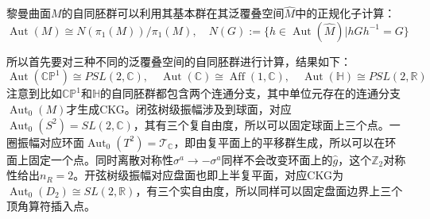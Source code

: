 \begin{boxedtext}[黎曼曲面自同胚群]
	黎曼曲面$M$的自同胚群可以利用其基本群在其泛覆叠空间$\hat M$中的正规化子计算：
	\begin{equation*}
		\operatorname{Aut}(M)\cong N(\pi_1(M))/\pi_1(M),\quad N(G):=\{h\in \operatorname{Aut}(\hat{M})|hGh^{-1}=G\}
	\end{equation*}
\end{boxedtext}
所以首先要对三种不同的泛覆叠空间的自同胚群进行计算，结果如下：
\begin{equation}
	\operatorname{Aut}(\mathbb{CP}^1)\cong PSL(2,\mathbb{C}),\quad
	\operatorname{Aut}(\mathbb{C})\cong \operatorname{Aff}(1,\mathbb{C}),\quad
	\operatorname{Aut}(\mathbb{H})\cong PSL(2,\mathbb{R})
\end{equation}
注意到比如$\mathbb{CP}^1$和$\mathbb{H}$的自同胚群都包含两个连通分支，其中单位元存在的连通分支$\operatorname{Aut}_0(M)$才生成CKG。闭弦树级振幅涉及到球面，对应$\operatorname{Aut}_0(S^2)=SL(2,\mathbb{C})$，其有三个复自由度，所以可以固定球面上三个点。一圈振幅对应环面$\operatorname{Aut}_0(T^2)=\mathcal{T}_\mathbb{C}$，即由复平面上的平移群生成，所以可以在环面上固定一个点。同时离散对称性$\sigma^a\to -\sigma^a$同样不会改变环面上的$\hat{g}$，这个$\mathbb{Z}_2$对称性给出$n_R=2$。开弦树级振幅对应盘面也即上半复平面，对应CKG为$\operatorname{Aut}_0(D_2)\cong SL(2,\mathbb{R})$，有三个实自由度，所以同样可以固定盘面边界上三个顶角算符插入点。

